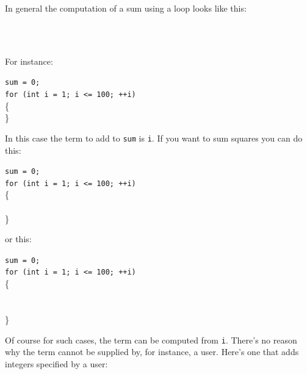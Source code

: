 




In general the computation of a sum using a loop looks like this:
\begin{flushleft}
\\
\\
\end{flushleft}
For instance:
\begin{flushleft}
\texttt{sum = 0;}\\
\texttt{for (int i = 1; i <= 100; ++i)}\\
\{
\\
\}
\end{flushleft}
In this case the term to add to \texttt{sum} is \texttt{i}. If you want to
sum squares you can do this:
\begin{flushleft}
\texttt{sum = 0;}\\
\texttt{for (int i = 1; i <= 100; ++i)}\\
\{\\
\\
\}\\
\end{flushleft}
or this:
\begin{flushleft}
\texttt{sum = 0;}\\
\texttt{for (int i = 1; i <= 100; ++i)}\\
\{\\
\\
\\
\}\\
\end{flushleft}
Of course for such cases, the term can be computed from \texttt{i}.
There's no reason why the term cannot be supplied by,
for instance, a user. Here's one that adds integers
specified by a user:
\newpage{}

